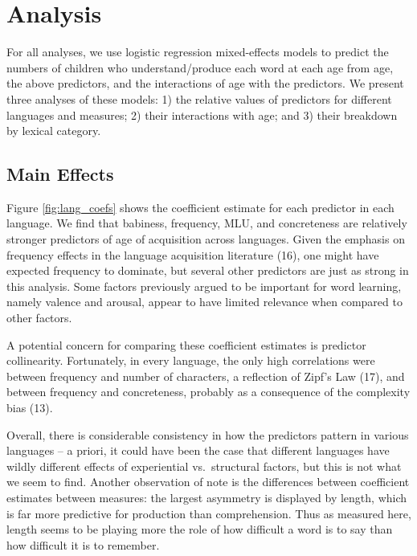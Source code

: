 \documentclass[9pt,twocolumn,twoside]{pnas-new}
\begin{document}
\section*{Analysis}\label{analysis}

For all analyses, we use logistic regression mixed-effects models to
predict the numbers of children who understand/produce each word at each
age from age, the above predictors, and the interactions of age with the
predictors. We present three analyses of these models: 1) the relative
values of predictors for different languages and measures; 2) their
interactions with age; and 3) their breakdown by lexical category.

\subsection{Main Effects}\label{main-effects}

Figure \ref{fig:lang_coefs} shows the coefficient estimate for each
predictor in each language. We find that babiness, frequency, MLU, and
concreteness are relatively stronger predictors of age of acquisition
across languages. Given the emphasis on frequency effects in the
language acquisition literature (16), one might have expected frequency
to dominate, but several other predictors are just as strong in this
analysis. Some factors previously argued to be important for word
learning, namely valence and arousal, appear to have limited relevance
when compared to other factors.

A potential concern for comparing these coefficient estimates is
predictor collinearity. Fortunately, in every language, the only high
correlations were between frequency and number of characters, a
reflection of Zipf's Law (17), and between frequency and concreteness,
probably as a consequence of the complexity bias (13).

Overall, there is considerable consistency in how the predictors pattern
in various languages -- a priori, it could have been the case that
different languages have wildly different effects of experiential
vs.~structural factors, but this is not what we seem to find. Another
observation of note is the differences between coefficient estimates
between measures: the largest asymmetry is displayed by length, which is
far more predictive for production than comprehension. Thus as measured
here, length seems to be playing more the role of how difficult a word
is to say than how difficult it is to remember.
\end{document}
